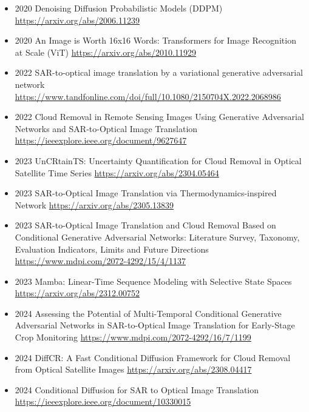 \begin{itemize}
    \item 2020 Denoising Diffusion Probabilistic Models (DDPM)
    \url{https://arxiv.org/abs/2006.11239}

    \item 2020 An Image is Worth 16x16 Words: Transformers for Image Recognition at Scale (ViT)
    \url{https://arxiv.org/abs/2010.11929}

    \item 2022 SAR-to-optical image translation by a variational generative adversarial network
    \url{https://www.tandfonline.com/doi/full/10.1080/2150704X.2022.2068986}

    \item 2022 Cloud Removal in Remote Sensing Images Using Generative Adversarial Networks and SAR-to-Optical Image Translation
    \url{https://ieeexplore.ieee.org/document/9627647}

    \item 2023 UnCRtainTS: Uncertainty Quantification for Cloud Removal in Optical Satellite Time Series
    \url{https://arxiv.org/abs/2304.05464}

    \item 2023 SAR-to-Optical Image Translation via Thermodynamics-inspired Network
    \url{https://arxiv.org/abs/2305.13839}
    
    \item 2023 SAR-to-Optical Image Translation and Cloud Removal Based on Conditional Generative Adversarial Networks: Literature Survey, Taxonomy, Evaluation Indicators, Limits and Future Directions
    \url{https://www.mdpi.com/2072-4292/15/4/1137}

    \item 2023 Mamba: Linear-Time Sequence Modeling with Selective State Spaces
    \url{https://arxiv.org/abs/2312.00752}
    
    \item 2024 Assessing the Potential of Multi-Temporal Conditional Generative Adversarial Networks in SAR-to-Optical Image Translation for Early-Stage Crop Monitoring
    \url{https://www.mdpi.com/2072-4292/16/7/1199}

    \item 2024 DiffCR: A Fast Conditional Diffusion Framework for Cloud Removal from Optical Satellite Images
    \url{https://arxiv.org/abs/2308.04417}

    \item 2024  Conditional Diffusion for SAR to Optical Image Translation
    \url{https://ieeexplore.ieee.org/document/10330015}


\end{itemize}
